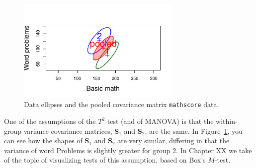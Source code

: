\documentclass[
  letterpaper,
  10pt,
  krantz2]{krantz}
\makeatletter
\newenvironment{Shaded}{\begin{snugshade}}{\end{snugshade}}
\newcommand{\AttributeTok}[1]{\textcolor[rgb]{0.40,0.45,0.13}{#1}}
\newcommand{\ConstantTok}[1]{\textcolor[rgb]{0.56,0.35,0.01}{#1}}
\newcommand{\DecValTok}[1]{\textcolor[rgb]{0.68,0.00,0.00}{#1}}
\newcommand{\FloatTok}[1]{\textcolor[rgb]{0.68,0.00,0.00}{#1}}
\newcommand{\FunctionTok}[1]{\textcolor[rgb]{0.28,0.35,0.67}{#1}}
\newcommand{\NormalTok}[1]{\textcolor[rgb]{0.00,0.23,0.31}{#1}}
\newcommand{\SpecialCharTok}[1]{\textcolor[rgb]{0.37,0.37,0.37}{#1}}
\newcommand{\StringTok}[1]{\textcolor[rgb]{0.13,0.47,0.30}{#1}}
\newenvironment{kframe}{%
  \medskip{}
  \setlength{\fboxsep}{.8em}
  \def\at@end@of@kframe{}%
  \ifinner\ifhmode%
  \def\at@end@of@kframe{\end{minipage}}%
  \begin{minipage}{\columnwidth}%
  \fi\fi%
  \def\FrameCommand##1{\hskip\@totalleftmargin \hskip-\fboxsep
  \colorbox{shadecolor}{##1}\hskip-\fboxsep
      \hskip-\linewidth \hskip-\@totalleftmargin \hskip\columnwidth}%
  \MakeFramed {\advance\hsize-\width
    \@totalleftmargin\z@ \linewidth\hsize
    \@setminipage}}%
{\par\unskip\endMakeFramed%
  \at@end@of@kframe}
\renewenvironment{Shaded}{\begin{kframe}}{\end{kframe}}
\makeatother
\begin{document}
\begin{Shaded}
\end{Shaded}

\begin{figure}[H]

{\centering \includegraphics[width=0.7\textwidth,height=\textheight]{figs/fig-mathscore-cov2-1.pdf}

}

\caption{\label{fig-mathscore-cov2}Data ellipses and the pooled
covariance matrix \texttt{mathscore} data.}

\end{figure}

One of the assumptions of the \(T^2\) test (and of MANOVA) is that the
within-group variance covariance matrices, \(\mathbf{S}_1\) and
\(\mathbf{S}_2\), are the same. In Figure~\ref{fig-mathscore-cov2}, you
can see how the shapes of \(\mathbf{S}_1\) and \(\mathbf{S}_2\) are very
similar, differing in that the variance of word Problems is slightly
greater for group 2. In Chapter XX we take of the topic of visualizing
tests of this assumption, based on Box's \(M\)-test.
\end{document}
